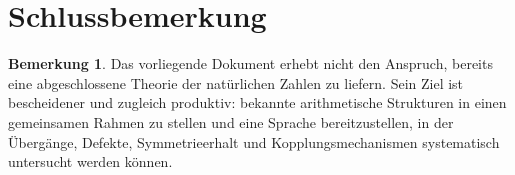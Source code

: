 \documentclass[11pt,a4paper]{article}
\theoremstyle{definition}
\newtheorem{bemerkung}[satz]{Bemerkung}
\begin{document}
\section{Schlussbemerkung}

\begin{bemerkung}
Das vorliegende Dokument erhebt nicht den Anspruch, bereits eine abgeschlossene Theorie der natürlichen Zahlen zu liefern. Sein Ziel ist bescheidener und zugleich produktiv: bekannte arithmetische Strukturen in einen gemeinsamen Rahmen zu stellen und eine Sprache bereitzustellen, in der Übergänge, Defekte, Symmetrieerhalt und Kopplungsmechanismen systematisch untersucht werden können.
\end{bemerkung}
\end{document}
